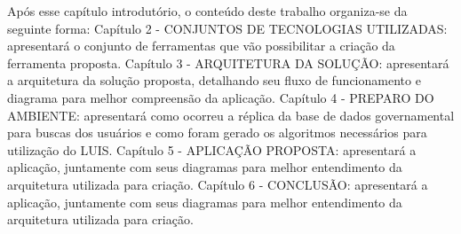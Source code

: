 Após esse capítulo introdutório, o conteúdo deste trabalho organiza-se da seguinte forma:
		Capítulo 2 - \uppercase{Conjuntos de tecnologias utilizadas}: apresentará o conjunto de ferramentas que vão possibilitar a criação da ferramenta proposta.
		Capítulo 3 - \uppercase{Arquitetura da solução}: apresentará a arquitetura da solução proposta, detalhando seu fluxo de funcionamento e diagrama para melhor compreensão da aplicação.
		Capítulo 4 - \uppercase{Preparo do ambiente}: apresentará como ocorreu a réplica da base de dados governamental para buscas dos usuários e como foram gerado os algoritmos necessários para utilização do LUIS.
		Capítulo 5 - \uppercase{Aplicação proposta}: apresentará a aplicação, juntamente com seus diagramas para melhor entendimento da arquitetura utilizada para criação.
		Capítulo 6 - \uppercase{Conclusão}: apresentará a aplicação, juntamente com seus diagramas para melhor entendimento da arquitetura utilizada para criação.

